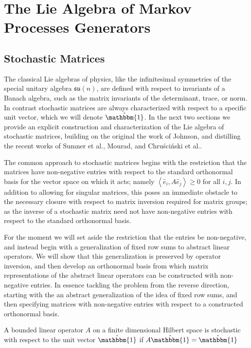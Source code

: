 \chapter{The Lie Algebra of Markov Processes Generators}
\section{Stochastic Matrices}
The classical Lie algebras of physics, like the infinitesimal symmetries
of the special unitary algebra $\mathfrak{su}(n)$, are defined with respect to
invariants of a Banach algebra, such as the matrix invariants of the 
determinant, trace, or norm. In contrast stochastic matrices are always 
characterized with respect to a specific unit vector, which we will denote 
$\hat{\mathbbm{1}}$. In the next two sections we provide an explicit 
construction and characterization of the Lie algebra of stochastic matrices, 
building on the original the work of Johnson\cite{johnson_markov-type_1985}, and
distilling the recent works of Sumner et al.\cite{sumner_lie_2012,fernandez-sanchez_lie_2012},
Mourad\cite{mourad_lie-theoretic_2004}, and Chruściński et al.\cite{chruscinski_pseudo-stochastic_2015}.

The common approach to stochastic matrices begins with the restriction that the 
matrices have non-negative entries with respect to the standard orthonormal 
basis for the vector space on which it acts; namely $\left\langle\hat{e}_i,A \hat{e}_j\right\rangle \ge 0$
for all $i,j$. In addition to allowing for singular matrices, this poses an 
immediate obstacle to the necessary closure with respect to matrix inversion 
required for matrix groups; as the inverse of a stochastic matrix need not have 
non-negative entries with respect to the standard orthonormal basis. 

For the moment we will set aside the restriction that the entries be 
non-negative, and instead begin with a generalization of fixed row sums to 
abstract linear operators. We will show that this generalization is preserved by 
operator inversion, and then develop an orthonormal basis from which matrix 
representations of the abstract linear operators can be constructed with 
non-negative entries. In essence tackling the problem from the reverse 
direction, starting with the an abstract generalization of the idea of fixed row 
sums, and then specifying matrices with non-negative entries with respect to a 
constructed orthonormal basis.

\begin{definition}
	A bounded linear operator $A$ on a finite dimensional Hilbert space is 
	stochastic with respect to the unit vector $\hat{\mathbbm{1}}$ if $A \hat{\mathbbm{1}} = \hat{\mathbbm{1}}$
\end{definition}

